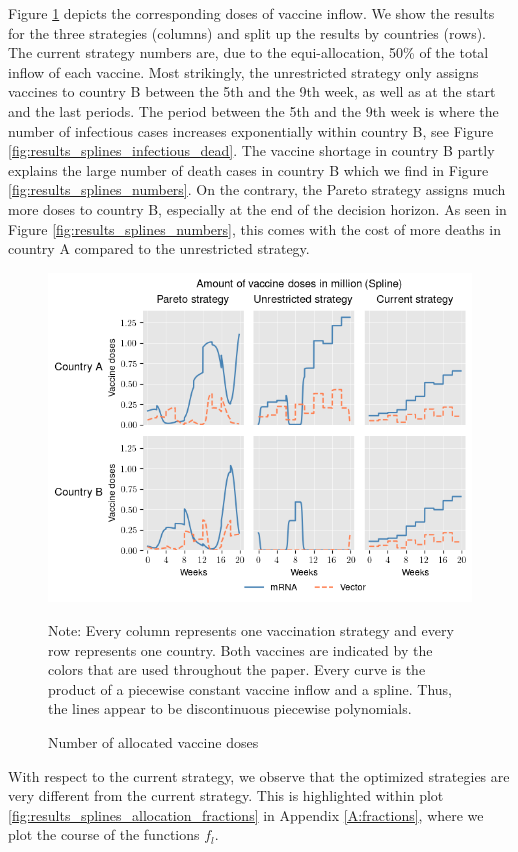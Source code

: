 Figure \ref{fig:results_splines_allocation} depicts the corresponding doses of vaccine inflow. We show the results for the three strategies (columns) and split up the results by countries (rows). The current strategy numbers are, due to the equi-allocation, 50\% of the total inflow of each vaccine. Most strikingly, the unrestricted strategy only assigns vaccines to country B between the 5th and the 9th week, as well as at the start and the last periods. The period between the 5th and the 9th week is where the number of infectious cases increases exponentially within country B, see Figure \ref{fig:results_splines_infectious_dead}.
The vaccine shortage in country B partly explains the large number of death cases in country B which we find in Figure \ref{fig:results_splines_numbers}. On the contrary, the Pareto strategy assigns much more doses to country B, especially at the end of the decision horizon. As seen in Figure \ref{fig:results_splines_numbers}, this comes with the cost of more deaths in country A compared to the unrestricted strategy.
\begin{figure}[h!]
\centering
\includegraphics[scale=0.85]{images/splines_vaccine_total_quantity.png}
\begin{flushleft}
\scriptsize{Note:} Every column represents one vaccination strategy and every row represents one country. Both vaccines are indicated by the colors that are used throughout the paper. 
Every curve is the product of a piecewise constant vaccine inflow and a spline. Thus, the lines appear to be discontinuous piecewise polynomials. 
\end{flushleft}
\caption{Number of allocated vaccine doses}
\label{fig:results_splines_allocation}
\end{figure}
With respect to the current strategy, we observe that the optimized strategies are very different from the current strategy. This is highlighted within plot \ref{fig:results_splines_allocation_fractions} in Appendix \ref{A:fractions}, where we plot the course of the functions $f_l$.\\
 
